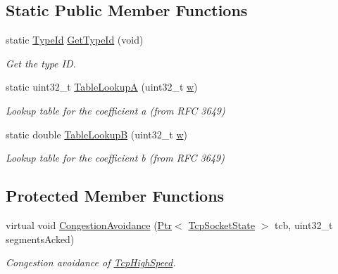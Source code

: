 \subsection*{Static Public Member Functions}
\begin{DoxyCompactItemize}
\item 
static \hyperlink{classns3_1_1TypeId}{Type\+Id} \hyperlink{classns3_1_1TcpHighSpeed_a4633dec3bfdc99e8ca7070d353debd03}{Get\+Type\+Id} (void)
\begin{DoxyCompactList}\small\item\em Get the type ID. \end{DoxyCompactList}\item 
static uint32\+\_\+t \hyperlink{classns3_1_1TcpHighSpeed_a32dac394d020a4a25e4948e0f1104840}{Table\+LookupA} (uint32\+\_\+t \hyperlink{mmwave_2model_2fading-traces_2fading__trace__generator_8m_afd61ec66f9d7b807eece6eb12c781844}{w})
\begin{DoxyCompactList}\small\item\em Lookup table for the coefficient a (from R\+FC 3649) \end{DoxyCompactList}\item 
static double \hyperlink{classns3_1_1TcpHighSpeed_a1b4f680bd8203ed450f818dca3edb28b}{Table\+LookupB} (uint32\+\_\+t \hyperlink{mmwave_2model_2fading-traces_2fading__trace__generator_8m_afd61ec66f9d7b807eece6eb12c781844}{w})
\begin{DoxyCompactList}\small\item\em Lookup table for the coefficient b (from R\+FC 3649) \end{DoxyCompactList}\end{DoxyCompactItemize}
\subsection*{Protected Member Functions}
\begin{DoxyCompactItemize}
\item 
virtual void \hyperlink{classns3_1_1TcpHighSpeed_ab241f8400ad52cff3e2f04ed8d00983c}{Congestion\+Avoidance} (\hyperlink{classns3_1_1Ptr}{Ptr}$<$ \hyperlink{classns3_1_1TcpSocketState}{Tcp\+Socket\+State} $>$ tcb, uint32\+\_\+t segments\+Acked)
\begin{DoxyCompactList}\small\item\em Congestion avoidance of \hyperlink{classns3_1_1TcpHighSpeed}{Tcp\+High\+Speed}. \end{DoxyCompactList}\end{DoxyCompactItemize}
